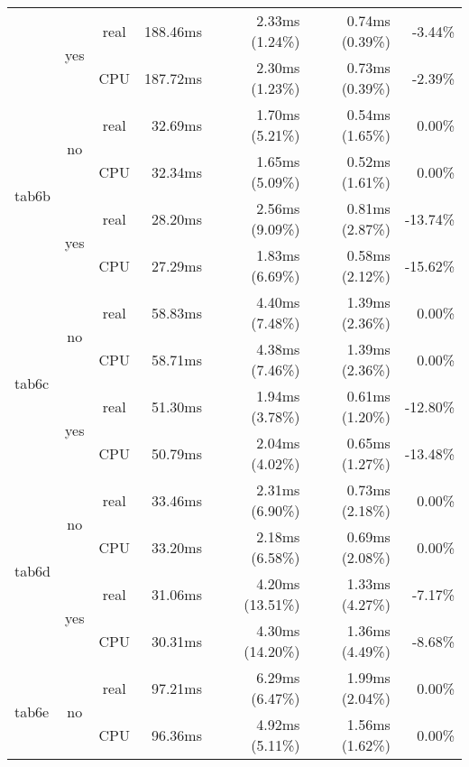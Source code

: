 \documentclass[en]{pracamgr}
\begin{document}
\begin{appendices}
\begin{small}
\begin{longtable}{|l|c|c|r|r|r|r|}
                          \cline{2-7}
                          & \multirow{2}{*}{yes} & real & 188.46ms & 2.33ms (1.24\%) & 0.74ms (0.39\%) & -3.44\% \\*
                          &                      & CPU  & 187.72ms & 2.30ms (1.23\%) & 0.73ms (0.39\%) & -2.39\% \\
\hline
\multirow{4}{*}{tab6b}    & \multirow{2}{*}{no}  & real & 32.69ms & 1.70ms (5.21\%) & 0.54ms (1.65\%) & 0.00\% \\*
                          &                      & CPU  & 32.34ms & 1.65ms (5.09\%) & 0.52ms (1.61\%) & 0.00\% \\*
                          \cline{2-7}
                          & \multirow{2}{*}{yes} & real & 28.20ms & 2.56ms (9.09\%) & 0.81ms (2.87\%) & -13.74\% \\*
                          &                      & CPU  & 27.29ms & 1.83ms (6.69\%) & 0.58ms (2.12\%) & -15.62\% \\
\hline
\multirow{4}{*}{tab6c}    & \multirow{2}{*}{no}  & real & 58.83ms & 4.40ms (7.48\%) & 1.39ms (2.36\%) & 0.00\% \\*
                          &                      & CPU  & 58.71ms & 4.38ms (7.46\%) & 1.39ms (2.36\%) & 0.00\% \\*
                          \cline{2-7}
                          & \multirow{2}{*}{yes} & real & 51.30ms & 1.94ms (3.78\%) & 0.61ms (1.20\%) & -12.80\% \\*
                          &                      & CPU  & 50.79ms & 2.04ms (4.02\%) & 0.65ms (1.27\%) & -13.48\% \\
\hline
\multirow{4}{*}{tab6d}    & \multirow{2}{*}{no}  & real & 33.46ms & 2.31ms (6.90\%) & 0.73ms (2.18\%) & 0.00\% \\*
                          &                      & CPU  & 33.20ms & 2.18ms (6.58\%) & 0.69ms (2.08\%) & 0.00\% \\*
                          \cline{2-7}
                          & \multirow{2}{*}{yes} & real & 31.06ms & 4.20ms (13.51\%) & 1.33ms (4.27\%) & -7.17\% \\*
                          &                      & CPU  & 30.31ms & 4.30ms (14.20\%) & 1.36ms (4.49\%) & -8.68\% \\
\hline
\multirow{4}{*}{tab6e}    & \multirow{2}{*}{no}  & real & 97.21ms & 6.29ms (6.47\%) & 1.99ms (2.04\%) & 0.00\% \\*
                          &                      & CPU  & 96.36ms & 4.92ms (5.11\%) & 1.56ms (1.62\%) & 0.00\% \\*

\end{longtable}
\end{small}
\end{appendices}
\end{document}

